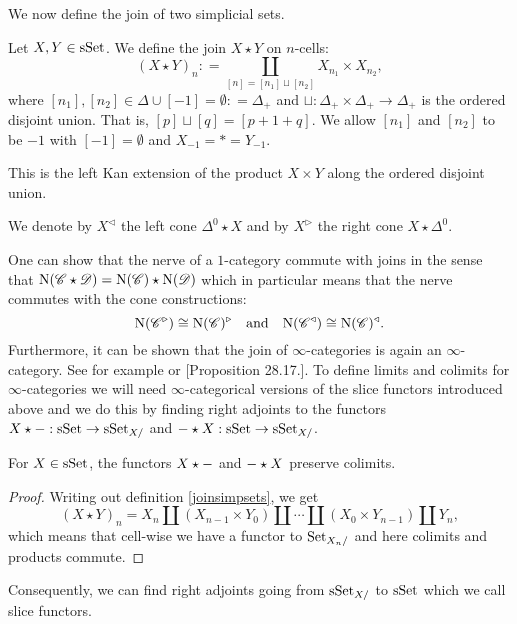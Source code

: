 \documentclass[../../thesis.tex]{subfiles}
\begin{document}
We now define the join of two simplicial sets.
\begin{definition}\label{joinsimpsets}
    Let $X, Y \in \mathrm{sSet}$.
    We define the join $X\star Y$ on $n$-cells:
    \[
        (X\star Y)_n : = \coprod_{[n] = [n_1] \sqcup [n_2]} X_{n_1} \times X_{n_2},
    \]
    where $[n_1], [n_2] \in \Delta \cup [-1] = \emptyset : = \Delta_+$ and $\sqcup: \Delta_+ \times \Delta_+ \to \Delta_+$ is the ordered disjoint union.
    That is, $[p] \sqcup [q] = [p+1+q]$.
    We allow $[n_1]$ and $[n_2]$ to be $-1$ with $[-1]=\emptyset$ and $X_{-1} = * = Y_{-1}$.
\end{definition}
\begin{remark}
    This is the left Kan extension of the product $X \times Y$ along the ordered disjoint union.
\end{remark}
\begin{example}
    We denote by $X^{\triangleleft}$ the left cone $\Delta^0 \star X$ and by $X^{\triangleright}$ the right cone $X\star \Delta^0$.
\end{example}
One can show that the nerve of a $1$-category commute with joins in the sense that $\mathrm{N}(\mathscr{C} \star \mathscr{D}) = \mathrm{N}(\mathscr{C}) \star \mathrm{N}(\mathscr{D})$ which in particular means that the nerve commutes with the cone constructions:
\[
    \mathrm{N}(\mathscr{C}^{\triangleright}) \cong \mathrm{N}(\mathscr{C})^{\triangleright}\quad \text{and} \quad\mathrm{N}(\mathscr{C}^{\triangleleft}) \cong \mathrm{N}(\mathscr{C})^{\triangleleft}.
\]
Furthermore, it can be shown that the join of $\infty$-categories is again an $\infty$-category.
See for example \cite[\href{https://kerodon.net/tag/02QV}{Corollary 02QV}]{kerodon} or \cite{Rezk}[Proposition 28.17.].
To define limits and colimits for $\infty$-categories we will need $\infty$-categorical versions of the slice functors introduced above and we do this by finding right adjoints to the functors $X\star {-} : \mathrm{sSet} \to \mathrm{sSet}_{X/}$ and ${-} \star X: \mathrm{sSet} \to \mathrm{sSet}_{X/}$.
\begin{proposition}
    For $X\in \mathrm{sSet}$, the functors $X\star {-}$ and ${-} \star X$ preserve colimits.
\end{proposition}
\begin{proof}
    Writing out definition \ref{joinsimpsets}, we get
    \[
        (X\star Y)_n = X_n \coprod (X_{n-1} \times Y_0) \coprod \cdots \coprod (X_0 \times Y_{n-1}) \coprod Y_n,
    \]
    which means that cell-wise we have a functor to $\mathrm{Set}_{X_n/}$ and here colimits and products commute.
\end{proof}
Consequently, we can find right adjoints going from $\mathrm{sSet}_{X/}$ to $\mathrm{sSet}$ which we call slice functors.
\end{document}
